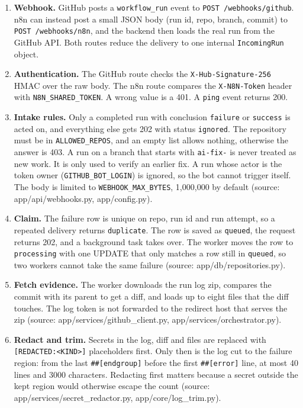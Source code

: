 \documentclass[11pt,a4paper]{report}
\begin{document}
\begin{enumerate}[leftmargin=*,itemsep=2pt]
\item \textbf{Webhook.} GitHub posts a \texttt{workflow\_\allowbreak{}run} event to \texttt{POST /\allowbreak{}webhooks/\allowbreak{}github}. n8n can instead post a small JSON body (run id, repo, branch, commit) to \texttt{POST /\allowbreak{}webhooks/\allowbreak{}n8n}, and the backend then loads the real run from the GitHub API. Both routes reduce the delivery to one internal \texttt{IncomingRun} object.
\item \textbf{Authentication.} The GitHub route checks the \texttt{X-\allowbreak{}Hub-\allowbreak{}Signature-\allowbreak{}256} HMAC over the raw body. The n8n route compares the \texttt{X-\allowbreak{}N8N-\allowbreak{}Token} header with \texttt{N8N\_\allowbreak{}SHARED\_\allowbreak{}TOKEN}. A wrong value is a 401. A \texttt{ping} event returns 200.
\item \textbf{Intake rules.} Only a completed run with conclusion \texttt{failure} or \texttt{success} is acted on, and everything else gets 202 with status \texttt{ignored}. The repository must be in \texttt{ALLOWED\_\allowbreak{}REPOS}, and an empty list allows nothing, otherwise the answer is 403. A run on a branch that starts with \texttt{ai-\allowbreak{}fix-\allowbreak{}} is never treated as new work. It is only used to verify an earlier fix. A run whose actor is the token owner (\texttt{GITHUB\_\allowbreak{}BOT\_\allowbreak{}LOGIN}) is ignored, so the bot cannot trigger itself. The body is limited to \texttt{WEBHOOK\_\allowbreak{}MAX\_\allowbreak{}BYTES}, 1,000,000 by default (source: app/api/webhooks.py, app/config.py).
\item \textbf{Claim.} The failure row is unique on repo, run id and run attempt, so a repeated delivery returns \texttt{duplicate}. The row is saved as \texttt{queued}, the request returns 202, and a background task takes over. The worker moves the row to \texttt{processing} with one UPDATE that only matches a row still in \texttt{queued}, so two workers cannot take the same failure (source: app/db/repositories.py).
\item \textbf{Fetch evidence.} The worker downloads the run log zip, compares the commit with its parent to get a diff, and loads up to eight files that the diff touches. The log token is not forwarded to the redirect host that serves the zip (source: app/services/github\_client.py, app/services/orchestrator.py).
\item \textbf{Redact and trim.} Secrets in the log, diff and files are replaced with \texttt{[REDACTED:\textless{}KIND\textgreater{}]} placeholders first. Only then is the log cut to the failure region: from the last \texttt{\#\#[endgroup]} before the first \texttt{\#\#[error]} line, at most 40 lines and 3000 characters. Redacting first matters because a secret outside the kept region would otherwise escape the count (source: app/services/secret\_redactor.py, app/core/log\_trim.py).

\end{enumerate}
\end{document}
